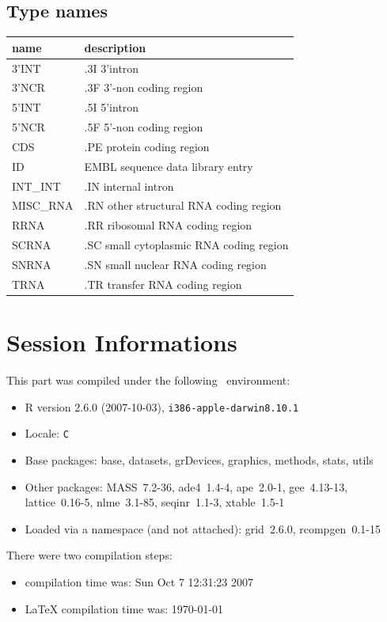\documentclass{article}
\begin{document}
\begin{Schunk}
\subsection{Type names}
\noindent\begin{tabular}{ll}
\hline \hline
name & description\\
\hline
3'INT & .3I 3'intron \\
3'NCR & .3F  3'-non coding region \\
5'INT & .5I 5'intron \\
5'NCR & .5F  5'-non coding region \\
CDS & .PE protein coding region \\
ID & EMBL sequence data library entry \\
INT\_INT & .IN  internal intron \\
MISC\_RNA & .RN other structural RNA coding region \\
RRNA & .RR ribosomal RNA coding region \\
SCRNA & .SC small cytoplasmic RNA coding region \\
SNRNA & .SN small nuclear RNA coding region \\
TRNA & .TR transfer RNA coding region \\
\hline \hline
\end{tabular}\end{Schunk}


\section{Session Informations}

This part was compiled under the following \Rlogo{}~environment:

\begin{itemize}
  \item R version 2.6.0 (2007-10-03), \verb|i386-apple-darwin8.10.1|
  \item Locale: \verb|C|
  \item Base packages: base, datasets, grDevices, graphics, methods,
    stats, utils
  \item Other packages: MASS~7.2-36, ade4~1.4-4, ape~2.0-1,
    gee~4.13-13, lattice~0.16-5, nlme~3.1-85, seqinr~1.1-3,
    xtable~1.5-1
  \item Loaded via a namespace (and not attached): grid~2.6.0,
    rcompgen~0.1-15
\end{itemize}
There were two compilation steps:

\begin{itemize}
  \item \Rlogo{} compilation time was: Sun Oct  7 12:31:23 2007
  \item \LaTeX{} compilation time was: \today
\end{itemize}


\clearpage
{}


\end{document}
